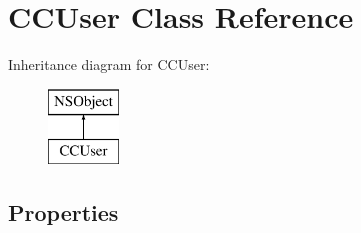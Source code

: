 \hypertarget{interface_c_c_user}{}\section{C\+C\+User Class Reference}
\label{interface_c_c_user}
Inheritance diagram for C\+C\+User\+:\begin{figure}[H]
\begin{center}
\leavevmode
\includegraphics[height=2.000000cm]{interface_c_c_user}
\end{center}
\end{figure}
\subsection*{Properties}
